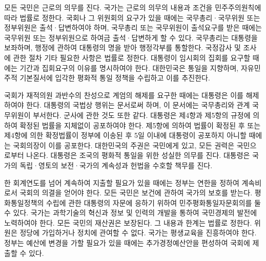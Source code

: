 \documentclass[../document.tex]{subfiles}
\begin{document}

\begin{abstractalt}


모든 국민은 근로의 의무를 진다. 국가는 근로의 의무의 내용과 조건을 민주주의원칙에 따라 법률로 정한다. 국회나 그 위원회의 요구가 있을 때에는 국무총리·국무위원 또는 정부위원은 출석·답변하여야 하며, 국무총리 또는 국무위원이 출석요구를 받은 때에는 국무위원 또는 정부위원으로 하여금 출석·답변하게 할 수 있다. 국무총리는 대통령을 보좌하며, 행정에 관하여 대통령의 명을 받아 행정각부를 통할한다. 국정감사 및 조사에 관한 절차 기타 필요한 사항은 법률로 정한다. 대통령이 임시회의 집회를 요구할 때에는 기간과 집회요구의 이유를 명시하여야 한다. 대한민국은 통일을 지향하며, 자유민주적 기본질서에 입각한 평화적 통일 정책을 수립하고 이를 추진한다.

국회가 재적의원 과반수의 찬성으로 계엄의 해제를 요구한 때에는 대통령은 이를 해제하여야 한다. 대통령의 국법상 행위는 문서로써 하며, 이 문서에는 국무총리와 관계 국무위원이 부서한다. 군사에 관한 것도 또한 같다. 대통령은 제4항과 제5항의 규정에 의하여 확정된 법률을 지체없이 공포하여야 한다. 제5항에 의하여 법률이 확정된 후 또는 제4항에 의한 확정법률이 정부에 이송된 후 5일 이내에 대통령이 공포하지 아니할 때에는 국회의장이 이를 공포한다. 대한민국의 주권은 국민에게 있고, 모든 권력은 국민으로부터 나온다. 대통령은 조국의 평화적 통일을 위한 성실한 의무를 진다. 대통령은 국가의 독립·영토의 보전·국가의 계속성과 헌법을 수호할 책무를 진다.

한 회계연도를 넘어 계속하여 지출할 필요가 있을 때에는 정부는 연한을 정하여 계속비로서 국회의 의결을 얻어야 한다. 모든 국민은 보건에 관하여 국가의 보호를 받는다. 평화통일정책의 수립에 관한 대통령의 자문에 응하기 위하여 민주평화통일자문회의를 둘 수 있다. 국가는 과학기술의 혁신과 정보 및 인력의 개발을 통하여 국민경제의 발전에 노력하여야 한다. 모든 국민의 재산권은 보장된다. 그 내용과 한계는 법률로 정한다. 위원은 정당에 가입하거나 정치에 관여할 수 없다. 국가는 평생교육을 진흥하여야 한다. 정부는 예산에 변경을 가할 필요가 있을 때에는 추가경정예산안을 편성하여 국회에 제출할 수 있다.

\end{abstractalt}
\end{document}
